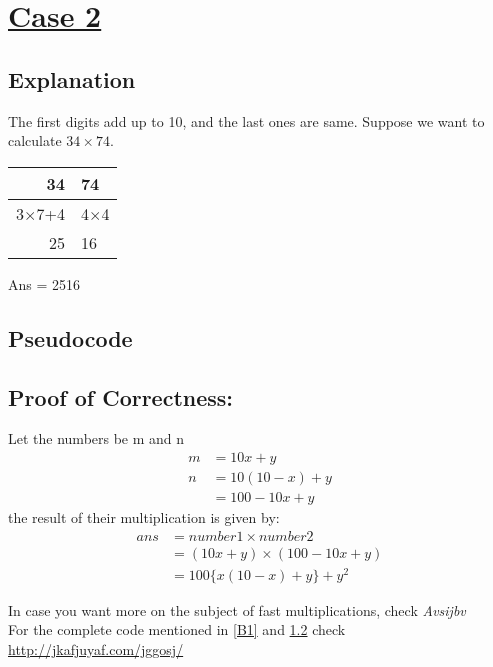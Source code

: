\documentclass[11pt, a4paper]{article}
\begin{document}
	\newpage
	\section{\underline{Case 2}}
	\subsection{Explanation}
	The first digits add up to 10, and the last ones are same.
	Suppose we want to calculate $34 \times 74$.
	
	{\begin{center}
	\begin{tabular}{rl}
		34 & 74\\
		\hline
		 3$\times$7+4 & 4$\times$4\\
		 25 & 16\\
	\end{tabular}
	\end{center}}
	Ans = 2516
	
	\subsection{Pseudocode}\label{B2}
	\begin{algorithm}
		{}
	\end{algorithm}
	
	\subsection{Proof of Correctness:\label{C2}\\}
	Let the numbers be m and n
	\begin{align*}
		m &= 10x+y\\
		n &= 10(10-x)+y\\
				&= 100 - 10x +y
	\end{align*}
	the result of their multiplication is given by:\\
	\begin{align*}
		ans &= number1 \times number2\\
				&= (10x+y) \times (100 - 10x + y)\\
				&= 100\{x(10-x)+y\} + y^2
	\end{align*}
	
	
	\newpage
	\vspace{0.5cm}
	\hspace{-0.7cm}
	In case you want more on the subject of fast multiplications, check \textit{Avsijbv}
	\cite{cite1}\\
	For the complete code mentioned in \ref{B1} and \ref{B2} check \url{http://jkafjuyaf.com/jggosj/}
	
	
	
\end{document}
